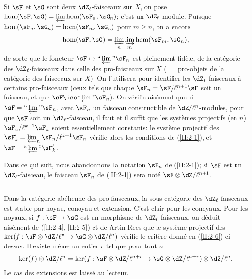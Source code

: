 Si $\sF$ et $\sG$ sont deux $\dZ_\ell$-faisceaux sur $X$, on pose 
$\hom(\sF,\sG) = \varprojlim \hom(\sF_n,\sG_n)$; c'est un $\dZ_\ell$-module. 
Puisque $\hom(\sF_n,\sG_n) = \hom(\sF_m,\sG_n)$ pour $m\geqslant n$, on a 
encore 
\[
  \hom(\sF,\sG) = \varprojlim_n \varinjlim_m \hom(\sF_m,\sG_n) \text{,}
\]
de sorte que le foncteur $\sF\mapsto \text{``}\varprojlim\text{''}\sF_n$ est 
pleinement fidèle, de la catégorie des $\dZ_\ell$-faisceaux dans celle des 
pro-faisceaux sur $X$ ($=$ pro-objets de la catégorie des faisceaux sur $X$). 
On l'utilisera pour identifier les $\dZ_\ell$-faisceaux à certains 
pro-faisceaux (ceux tels que chaque $\sF_n=\sF/\ell^{n+1}\sF$ soit un faisceau, 
et que $\sF\iso \text{``}\varprojlim\text{''}\sF_n$). On vérifie aisément 
que si $\sF=\text{``}\varprojlim\text{''}\sF_n$, avec $\sF_n$ un faisceau 
constructible de $\dZ/\ell^n$-modules, pour que $\sF$ soit un 
$\dZ_\ell$-faisceau, il faut et il suffit que les systèmes projectifs (en $n$) 
$\sF_n/\ell^{k+1}\sF_n$ soient essentiellement constants: le système 
projectif des $\sF_k'=\varprojlim_n\sF_n/\ell^{k+1}\sF_n$ vérifie alors les 
conditions de (\ref{II:2-1}), et $\sF=\text{``}\varprojlim\text{''}\sF_k'$. 

Dans ce qui suit, nous abandonnons la notation $\sF_n$ de (\ref{II:2-1}); si 
$\sF$ est un $\dZ_\ell$-faisceau, le faisceau $\sF_n$ de (\ref{II:2-1}) sera 
noté $\sF\otimes\dZ/\ell^{n+1}$. 





\subsection{}\label{II:2-7}

Dans la catégorie abélienne des pro-faisceaux, la sous-catégorie des 
$\dZ_\ell$-faisceaux est stable par noyau, conoyau et extension. C'est clair 
pour les conoyaux. Pour les noyaux, si $f:\sF\to\sG$ est un morphisme de 
$\dZ_\ell$-faisceaux, on déduit aisément de (\ref{II:2-4}, \ref{II:2-5}) 
et de Artin-Rees que le système projectif des 
$\ker(f:\sF\otimes\dZ/\ell^n\to\sG\otimes\dZ/\ell^n)$ vérifie le critère 
donné en (\ref{II:2-6}) ci-dessus. Il existe même un entier $r$ tel que pour 
tout $n$ 
\[
  \ker(f)\otimes\dZ/\ell^n = \ker(f:\sF\otimes\dZ/\ell^{n+r}\to\sG\otimes\dZ/\ell^{n+r})\otimes\dZ/\ell^n \text{.}
\]
Le cas des extensions est laissé au lecteur. 





